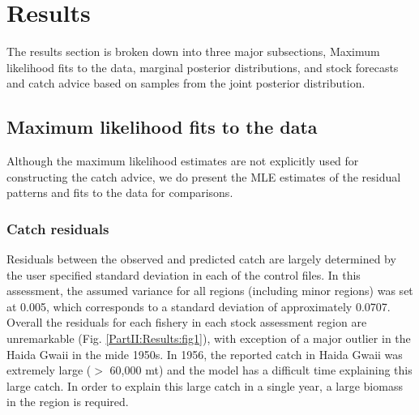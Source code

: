 \section{Results}
The results section is broken down into three major subsections, Maximum likelihood fits to the data, marginal posterior distributions, and stock forecasts and catch advice based on samples from the joint posterior distribution.

\subsection{Maximum likelihood fits to the data}
Although  the maximum likelihood estimates are not explicitly used for constructing the catch advice, we do present the MLE estimates of the residual patterns and fits to the data for comparisons.

\subsubsection{Catch residuals}
Residuals between the observed and predicted catch are largely determined by the user specified standard deviation in each of the control files.  In this assessment, the assumed variance for all regions (including minor regions) was set at 0.005, which corresponds to a standard deviation of approximately 0.0707.  Overall the residuals for each fishery in each stock assessment region are unremarkable (Fig. \ref{PartII:Results:fig1}), with exception of a  major outlier in the Haida Gwaii in the mide 1950s.  In 1956, the reported catch in Haida Gwaii was extremely large ($>$ 60,000 mt) and the model has a difficult time explaining this large catch. In order to explain this large catch in a single year, a large biomass in the region is required.

